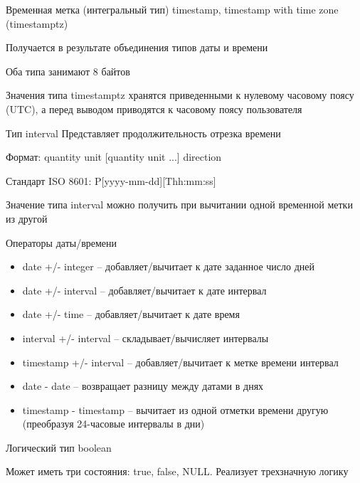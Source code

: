 \documentclass[12pt]{article}
\begin{document}
\begin{defin}{Временная метка (интегральный тип)}
    timestamp, timestamp with time zone (timestamptz)

    Получается в результате объединения типов даты и времени 

    Оба типа занимают 8 байтов 

    Значения типа timestamptz хранятся приведенными к нулевому часовому поясу (UTC), а перед выводом приводятся к часовому поясу пользователя 
\end{defin}

\begin{defin}{Тип interval}
    Представляет продолжительность отрезка времени 

    Формат: quantity unit [quantity unit ...] direction

    Стандарт ISO 8601: P[yyyy-mm-dd][Thh:mm:ss]

    Значение типа interval можно получить при вычитании одной временной метки из другой 
\end{defin}

\begin{nota}{Операторы даты/времени}
    \begin{itemize}
        \item date +/- integer -- добавляет/вычитает к дате заданное число дней 
        \item date +/- interval -- добавляет/вычитает к дате интервал 
        \item date +/- time -- добавляет/вычитает к дате время 
        \item interval +/- interval -- складывает/вычисляет интервалы 
        \item timestamp +/- interval -- добавляет/вычитает к метке времени интервал 
        \item date - date -- возвращает разницу между датами в днях 
        \item timestamp - timestamp -- вычитает из одной отметки времени другую (преобразуя 24-часовые интервалы в дни)
    \end{itemize}
\end{nota}

\begin{defin}{Логический тип}
    boolean

    Может иметь три состояния: true, false, NULL. Реализует трехзначную логику 
\end{defin}
\end{document}
